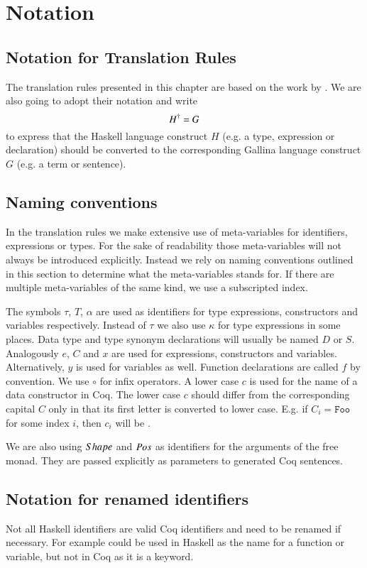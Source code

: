\section{Notation} \label{sec:translation:notation}
\subsection{Notation for Translation Rules}
The translation rules presented in this chapter are based on the work by \cite{Abel:2005}.
We are also going to adopt their notation and write
\[
  {H}^{\dagger} = G
\]
to express that the Haskell language construct $H$ (e.g. a type, expression or declaration) should be converted to the corresponding Gallina language construct $G$ (e.g. a term or sentence).

\subsection{Naming conventions}
In the translation rules we make extensive use of meta-variables for identifiers, expressions or types.
For the sake of readability those meta-variables will not always be introduced explicitly.
Instead we rely on naming conventions outlined in this section to determine what the meta-variables stands for.
If there are multiple meta-variables of the same kind, we use a subscripted index.

The symbols $\tau$, $T$, $\alpha$ are used as identifiers for type expressions, constructors and variables respectively.
Instead of $\tau$ we also use $\kappa$ for type expressions in some places.
Data type and type synonym declarations will usually be named $D$ or $S$.
Analogously $e$, $C$ and $x$ are used for expressions, constructors and variables.
Alternatively, $y$ is used for variables as well.
Function declarations are called $f$ by convention.
We use $\circ$ for infix operators.
A lower case $c$ is used for the name of a data constructor in Coq.
The lower case $c$ should differ from the corresponding capital $C$ only in that its first letter is converted to lower case.
E.g. if $C_i = \texttt{Foo}$ for some index $i$, then $c_i$ will be .

We are also using $Shape$ and $Pos$ as identifiers for the arguments of the free monad.
They are passed explicitly as parameters to generated Coq sentences.

\subsection{Notation for renamed identifiers}
Not all Haskell identifiers are valid Coq identifiers and need to be renamed if necessary.
For example  could be used in Haskell as the name for a function or variable, but not in Coq as it is a keyword.


